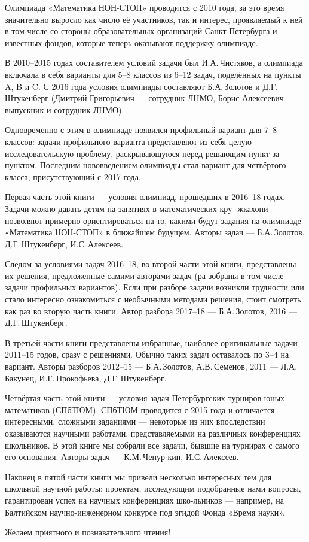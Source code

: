 \noindent\abz Олимпиада «Математика НОН-СТОП» проводится с 2010 года, за это время значительно выросло как число её участников, так и интерес, проявляемый к ней в том числе со стороны образовательных организаций Санкт-Петербурга и известных фондов, которые теперь оказывают поддержку олимпиаде.

\aabz В 2010–2015 годах составителем условий задачи был И.А.\,Чистяков, а олимпиада включала в себя варианты для 5–8 классов из 6–12 задач, поделённых на пункты A, B и C. С 2016 года условия олимпиады составляют Б.А.\,Золотов и Д.Г.\,Штукенберг (Дмитрий Григорьевич — сотрудник ЛНМО, Борис Алексеевич — выпускник и сотрудник ЛНМО).

\aabz Одновременно с этим в олимпиаде появился профильный вариант для 7–8 классов: задачи профильного варианта представляют из себя целую исследовательскую проблему, раскрывающуюся перед решающим пункт за пунктом. Последним нововведением олимпиады стал вариант для четвёртого класса, присутствующий с 2017 года.

\aabz Первая часть этой книги — условия олимпиад, прошедших в 2016–18 годах. Задачи можно давать детям на занятиях в математических кру- жках\scolon они позволяют примерно ориентироваться на то, какими будут задания на олимпиаде «Математика НОН-СТОП» в ближайшем будущем. Авторы задач — Б.А.\,Золотов, Д.Г.\,Штукенберг, И.С.\,Алексеев.

\aabz Следом за условиями задач 2016–18, во второй части этой книги, представлены их решения, предложенные самими авторами задач (ра-\linebreak зобраны в том числе задачи профильных вариантов). Если при разборе задачи возникли трудности или стало интересно ознакомиться с необычными методами решения, стоит смотреть как раз во вторую часть книги. Автор разбора 2017–18 — Б.А.\,Золотов, 2016 — Д.Г.\,Штукенберг.

\aabz В третьей части книги представлены избранные, наиболее оригинальные задачи 2011–15 годов, сразу с решениями. Обычно таких задач оставалось по 3–4 на вариант. Авторы разборов 2012–15 — Б.А.\,Золотов, А.В.\,Семенов, 2011 — Л.А.\,Бакунец, И.Г.\,Прокофьева, Д.Г.\,Штукенберг.

\aabz Четвёртая часть этой книги — условия задач Петербургских турниров юных математиков (СПбТЮМ). СПбТЮМ проводится с 2015 года и отличается интересными, сложными заданиями — некоторые из них впоследствии оказываются научными работами, представляемыми на различных конференциях школьников. В этой книге мы собрали все задачи, бывшие на турнирах с самого его основания. Авторы задач — К.М.\,Чепур-\linebreak кин, И.С.\,Алексеев.

\aabz Наконец в пятой части книги мы привели несколько интересных тем для школьной научной работы: проектам, исследующим подобранные нами вопросы, гарантирован успех на научных конференциях шко-\linebreak льников — например, на Балтийском научно-инженерном конкурсе под эгидой Фонда «Время науки».

\aabz Желаем приятного и познавательного чтения!